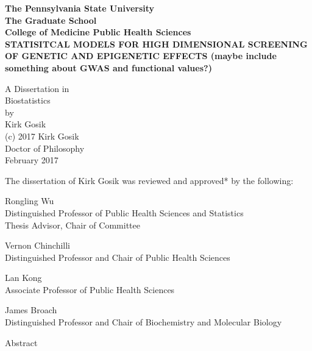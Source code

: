 \documentclass[11pt,]{book}
\title{}
\author{}
\date{}
\theoremstyle{definition}
\theoremstyle{definition}
\theoremstyle{remark}
\begin{document}
\begin{center}
\bf{The Pennsylvania State University} \\
The Graduate School \\
College of Medicine Public Health Sciences \\


STATISITCAL MODELS FOR HIGH DIMENSIONAL SCREENING OF GENETIC AND EPIGENETIC EFFECTS
(maybe include something about GWAS and functional values?)

A Dissertation in \\
Biostatistics \\
by \\
Kirk Gosik \\
(c) 2017 Kirk Gosik \\

Doctor of Philosophy \\
February 2017 \\

\newpage

The dissertation of Kirk Gosik was reviewed and approved* by the following:

Rongling Wu \\
Distinguished Professor of Public Health Sciences and Statistics \\
Thesis Advisor, Chair of Committee

Vernon Chinchilli \\
Distinguished Professor and Chair of Public Health Sciences


Lan Kong \\
Associate Professor of Public Health Sciences

James Broach \\
Distinguished Professor and Chair of Biochemistry and Molecular Biology \\


\newpage

Abstract


\end{center}
\end{document}
